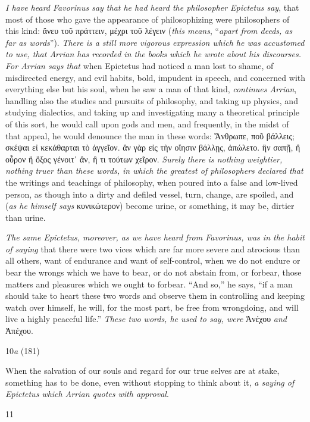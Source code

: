 \emph{I have heard Favorinus say that he had heard the philosopher Epictetus say}, that most of those who gave the appearance of philosophizing were philosophers of this kind: ἄνευ τοῦ πράττειν, μέχρι τοῦ λέγειν (\emph{this means}, ``\emph{apart from deeds, as far as words}''). \emph{There is a still more vigorous expression which he was accustomed to use, that Arrian has recorded in the books which he wrote about his discourses. For Arrian says that} when Epictetus had noticed a man lost to shame, of misdirected energy, and evil habits, bold, impudent in speech, and concerned with everything else but his soul, when he saw a man of that kind, \emph{continues Arrian}, handling also the studies and pursuits of philosophy, and taking up physics, and studying dialectics, and taking up and investigating many a theoretical principle of this sort, he would call upon gods and men, and frequently, in the midst of that appeal, he would denounce the man in these words: Ἄνθρωπε, ποῦ βάλλεις; σκέψαι εἰ κεκάθαρται τὸ ἀγγεῖον. ἂν γὰρ εἰς τὴν οἴησιν βάλλῃς, ἀπώλετο. ἢν σαπῇ, ἢ οὖρον ἢ ὂξος γένοιτ᾽ ἂν, ἢ τι τούτων χεῖρον. \emph{Surely there is nothing weightier, nothing truer than these words, in which the greatest of philosophers declared that} the writings and teachings of philosophy, when poured into a false and low-lived person, as though into a dirty and defiled vessel, turn, change, are spoiled, and (\emph{as he himself says} κυνικώτερον) become urine, or something, it may be, dirtier than urine.

\emph{The same Epictetus, moreover, as we have heard from Favorinus, was in the habit of saying} that there were two vices which are far more severe and atrocious than all others, want of endurance and want of self-control, when we do not endure or bear the wrongs which we have to bear, or do not abstain from, or forbear, those matters and pleasures which we ought to forbear. ``And so,'' he says, ``if a man should take to heart these two words and observe them in controlling and keeping watch over himself, he will, for the most part, be free from wrongdoing, and will live a highly peaceful life.'' \emph{These two words, he used to say, were} Ἀνέχου \emph{and} Ἀπέχου.

10\emph{a} (181)

When the salvation of our souls and regard for our true selves are at stake, something has to be done, even without stopping to think about it, \emph{a saying of Epictetus which Arrian quotes with approval}.

11

